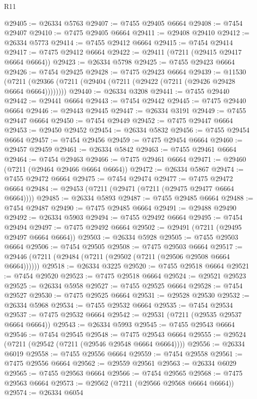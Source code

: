 \begin{lexlean}{R11}
\begin{coremodule}
@29405 := @26334 @5763
@29407 := @7455 @29405 @6664
@29408 := @7454 @29407
@29410 := @7475 @29405 @6664
@29411 := @29408 @29410
@29412 := @26334 @5773
@29414 := @7455 @29412 @6664
@29415 := @7454 @29414
@29417 := @7475 @29412 @6664
@29422 := @29411 (@7211 (@29415 @29417 @6664 @6664))
@29423 := @26334 @5798
@29425 := @7455 @29423 @6664
@29426 := @7454 @29425
@29428 := @7475 @29423 @6664
@29439 := @11530
    (@7211 (@29366 (@7211 (@29404 (@7211 (@29422 (@7211 (@29426 @29428 @6664 @6664))))))))
@29440 := @26334 @3208
@29441 := @7455 @29440
@29442 := @29441 @6664
@29443 := @7454 @29442
@29445 := @7475 @29440 @6664
@29446 := @29443 @29445
@29447 := @26334 @3191
@29449 := @7455 @29447 @6664
@29450 := @7454 @29449
@29452 := @7475 @29447 @6664
@29453 := @29450 @29452
@29454 := @26334 @5832
@29456 := @7455 @29454 @6664
@29457 := @7454 @29456
@29459 := @7475 @29454 @6664
@29460 := @29457 @29459
@29461 := @26334 @5842
@29463 := @7455 @29461 @6664
@29464 := @7454 @29463
@29466 := @7475 @29461 @6664
@29471 := @29460 (@7211 (@29464 @29466 @6664 @6664))
@29472 := @26334 @5867
@29474 := @7455 @29472 @6664
@29475 := @7454 @29474
@29477 := @7475 @29472 @6664
@29484 := @29453 (@7211 (@29471 (@7211 (@29475 @29477 @6664 @6664))))
@29485 := @26334 @5893
@29487 := @7455 @29485 @6664
@29488 := @7454 @29487
@29490 := @7475 @29485 @6664
@29491 := @29488 @29490
@29492 := @26334 @5903
@29494 := @7455 @29492 @6664
@29495 := @7454 @29494
@29497 := @7475 @29492 @6664
@29502 := @29491 (@7211 (@29495 @29497 @6664 @6664))
@29503 := @26334 @5928
@29505 := @7455 @29503 @6664
@29506 := @7454 @29505
@29508 := @7475 @29503 @6664
@29517 := @29446 (@7211 (@29484 (@7211 (@29502 (@7211 (@29506 @29508 @6664 @6664))))))
@29518 := @26334 @3225
@29520 := @7455 @29518 @6664
@29521 := @7454 @29520
@29523 := @7475 @29518 @6664
@29524 := @29521 @29523
@29525 := @26334 @5958
@29527 := @7455 @29525 @6664
@29528 := @7454 @29527
@29530 := @7475 @29525 @6664
@29531 := @29528 @29530
@29532 := @26334 @5968
@29534 := @7455 @29532 @6664
@29535 := @7454 @29534
@29537 := @7475 @29532 @6664
@29542 := @29531 (@7211 (@29535 @29537 @6664 @6664))
@29543 := @26334 @5993
@29545 := @7455 @29543 @6664
@29546 := @7454 @29545
@29548 := @7475 @29543 @6664
@29555 := @29524 (@7211 (@29542 (@7211 (@29546 @29548 @6664 @6664))))
@29556 := @26334 @6019
@29558 := @7455 @29556 @6664
@29559 := @7454 @29558
@29561 := @7475 @29556 @6664
@29562 := @29559 @29561
@29563 := @26334 @6029
@29565 := @7455 @29563 @6664
@29566 := @7454 @29565
@29568 := @7475 @29563 @6664
@29573 := @29562 (@7211 (@29566 @29568 @6664 @6664))
@29574 := @26334 @6054

\end{coremodule}
\end{lexlean}
